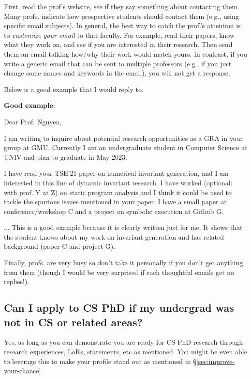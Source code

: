 \documentclass[11pt]{article}
\newenvironment{commentbox}[1][]{
\small
    \begin{cbox}
    \textbf{#1}: 
 }{
   \end{cbox}
}
\begin{document}
First, read the prof's website, see if they say something about contacting them. Many profs. indicate how prospective students should contact them (e.g., using specific email subjects). 
In general, the best way to catch the prof.'s attention is to \emph{customize your email} to that faculty.  For example, read their papers, know what they work on, and see if you are interested in their research. Then send them an email talking how/why their work would match yours.
In contrast, if you write a generic email that can be sent to multiple professors (e.g., if you just change some names and keywords in the email), you will not get a response. 

Below is a good example that I would reply to.   

\begin{commentbox}[Good example]

Dear Prof. Nguyen,

I am writing to inquire about potential research opportunities as a GRA in your group at GMU. Currently I am an undergraduate student in Computer Science at UNIV and plan to graduate in May 2023.

 
I have read your TSE'21 paper on numerical invariant generation, and I am interested in this line of dynamic invariant research. I have worked (optional: with prof. Y at Z) on static program analysis and I think it could be used to tackle the spurious issues mentioned in your paper. I have a small paper at conference/workshop C and a project on symbolic execution at Github G.

...
\tcblower
This is a good example because it is clearly written just for me.  It shows that the student knows about my work on invariant generation and has related  background (paper C and project G). 
\end{commentbox}

Finally, profs. are very busy so don't take it personally if you don't get anything from them (though I would be very surprised if such thoughtful emails get no replies!). 




\subsection{Can I apply to CS PhD if my undergrad was not in CS or related areas?}

Yes, as long as you can demonstrate you are ready for CS PhD research through research experiences, LoRs, statements, etc as mentioned. You might be even able to leverage this to make your profile stand out as mentioned in \S\ref{sec:improve-your-chance}. 
\end{document}
